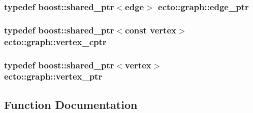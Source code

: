 \subsubsection[{\texorpdfstring{edge\+\_\+ptr}{edge_ptr}}]{\setlength{\rightskip}{0pt plus 5cm}typedef boost\+::shared\+\_\+ptr$<${\bf edge}$>$ {\bf ecto\+::graph\+::edge\+\_\+ptr}}\hypertarget{namespaceecto_1_1graph_ad6da390ef18395607e6eab139f37fcf4}{}\label{namespaceecto_1_1graph_ad6da390ef18395607e6eab139f37fcf4}
\subsubsection[{\texorpdfstring{vertex\+\_\+cptr}{vertex_cptr}}]{\setlength{\rightskip}{0pt plus 5cm}typedef boost\+::shared\+\_\+ptr$<$const {\bf vertex}$>$ {\bf ecto\+::graph\+::vertex\+\_\+cptr}}\hypertarget{namespaceecto_1_1graph_ab1ad7248e81caff384fed98d61fca8ca}{}\label{namespaceecto_1_1graph_ab1ad7248e81caff384fed98d61fca8ca}
\subsubsection[{\texorpdfstring{vertex\+\_\+ptr}{vertex_ptr}}]{\setlength{\rightskip}{0pt plus 5cm}typedef boost\+::shared\+\_\+ptr$<${\bf vertex}$>$ {\bf ecto\+::graph\+::vertex\+\_\+ptr}}\hypertarget{namespaceecto_1_1graph_a878e413dd7cdb7395b02f5be20e12b51}{}\label{namespaceecto_1_1graph_a878e413dd7cdb7395b02f5be20e12b51}


\subsection{Function Documentation}
